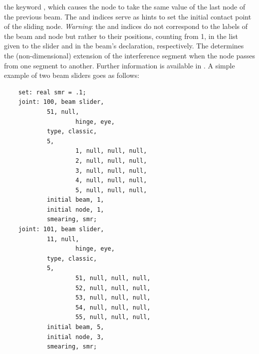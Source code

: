 the keyword , which causes the node to take the same
value of the last node of the previous beam.
The  and  indices
serve as hints to set the initial contact point of the sliding node.
\textit{Warning}: the  and 
indices do not correspond to the labels of the beam 
and node but rather to their positions, counting from 1,
in the list given to the slider
and in the beam's declaration, respectively.
The  determines the (non-dimensional) extension
of the interference segment when the node passes from one segment
to another.
Further information is available in \cite{SLIDER-AIDAA-2003}.
A simple example of two beam sliders goes as follows:
\begin{verbatim}
    set: real smr = .1;
    joint: 100, beam slider,
            51, null,
                    hinge, eye,
            type, classic,
            5,
                    1, null, null, null,
                    2, null, null, null,
                    3, null, null, null,
                    4, null, null, null,
                    5, null, null, null,
            initial beam, 1,
            initial node, 1,
            smearing, smr;
    joint: 101, beam slider,
            11, null,
                    hinge, eye,
            type, classic,
            5,
                    51, null, null, null,
                    52, null, null, null,
                    53, null, null, null,
                    54, null, null, null,
                    55, null, null, null,
            initial beam, 5,
            initial node, 3,
            smearing, smr;
\end{verbatim}


